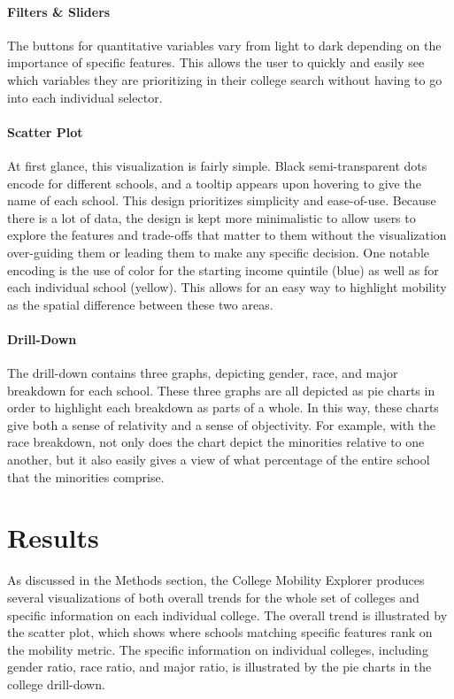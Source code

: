 \documentclass{vgtc}
\begin{document}
\paragraph{Filters \& Sliders}
The buttons for quantitative variables vary from light to dark depending on the importance of specific features. This allows the user to quickly and easily see which variables they are prioritizing in their college search without having to go into each individual selector.

\paragraph{Scatter Plot}
At first glance, this visualization is fairly simple. Black semi-transparent dots encode for different schools, and a tooltip appears upon hovering to give the name of each school. This design prioritizes simplicity and ease-of-use. Because there is a lot of data, the design is kept more minimalistic to allow users to explore the features and trade-offs that matter to them without the visualization over-guiding them or leading them to make any specific decision. One notable encoding is the use of color for the starting income quintile (blue) as well as for each individual school (yellow). This allows for an easy way to highlight mobility as the spatial difference between these two areas.

\paragraph{Drill-Down}
The drill-down contains three graphs, depicting gender, race, and major breakdown for each school. These three graphs are all depicted as pie charts in order to highlight each breakdown as parts of a whole. In this way, these charts give both a sense of relativity and a sense of objectivity. For example, with the race breakdown, not only does the chart depict the minorities relative to one another, but it also easily gives a view of what percentage of the entire school that the minorities comprise.

\section{Results}
As discussed in the Methods section, the College Mobility Explorer produces several visualizations of both overall trends for the whole set of colleges and specific information on each individual college. The overall trend is illustrated by the scatter plot, which shows where schools matching specific features rank on the mobility metric. The specific information on individual colleges, including gender ratio, race ratio, and major ratio, is illustrated by the pie charts in the college drill-down. 
\end{document}
